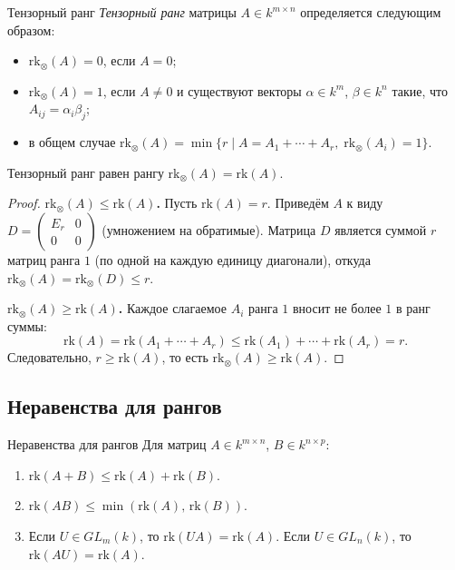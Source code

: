 \begin{Definition}{Тензорный ранг}{}
    \emph{Тензорный ранг} матрицы $A \in k^{m \times n}$ определяется следующим образом:
    \begin{itemize}
        \item $\mathrm{rk}_{\otimes}(A) = 0$, если $A = 0$;
        \item $\mathrm{rk}_{\otimes}(A) = 1$, если $A \neq 0$ и существуют векторы
              $\alpha \in k^m$, $\beta \in k^n$ такие, что $A_{ij} = \alpha_i \beta_j$;
        \item в общем случае $\mathrm{rk}_{\otimes}(A) = \min\bigl\{r \mid A = A_1 + \cdots + A_r,\;
              \mathrm{rk}_{\otimes}(A_i) = 1\bigr\}$.
    \end{itemize}
\end{Definition}
\begin{Theorem}{Тензорный ранг равен рангу}{}
    $\mathrm{rk}_{\otimes}(A) = \mathrm{rk}(A)$.
\end{Theorem}

\begin{proof}
\textbf{$\mathrm{rk}_{\otimes}(A) \leq \mathrm{rk}(A)$.} Пусть $\mathrm{rk}(A) = r$. Приведём $A$ к виду $D = \begin{pmatrix} E_r & 0 \\ 0 & 0 \end{pmatrix}$ (умножением на обратимые). Матрица $D$ является суммой $r$ матриц ранга $1$ (по одной на каждую единицу диагонали), откуда $\mathrm{rk}_{\otimes}(A) = \mathrm{rk}_{\otimes}(D) \leq r$.

\textbf{$\mathrm{rk}_{\otimes}(A) \geq \mathrm{rk}(A)$.} Каждое слагаемое $A_i$ ранга $1$ вносит не более $1$ в ранг суммы:
\[
    \mathrm{rk}(A) = \mathrm{rk}(A_1 + \cdots + A_r) \leq \mathrm{rk}(A_1) + \cdots + \mathrm{rk}(A_r) = r.
\]
Следовательно, $r \geq \mathrm{rk}(A)$, то есть $\mathrm{rk}_{\otimes}(A) \geq \mathrm{rk}(A)$.
\end{proof}

\subsection{Неравенства для рангов}

\begin{Theorem}{Неравенства для рангов}{}
    Для матриц $A \in k^{m \times n}$, $B \in k^{n \times p}$:
    \begin{enumerate}
        \item $\mathrm{rk}(A + B) \leq \mathrm{rk}(A) + \mathrm{rk}(B)$.
        \item $\mathrm{rk}(AB) \leq \min(\mathrm{rk}(A),\, \mathrm{rk}(B))$.
        \item Если $U \in GL_m(k)$, то $\mathrm{rk}(UA) = \mathrm{rk}(A)$. Если $U \in GL_n(k)$, то $\mathrm{rk}(AU) = \mathrm{rk}(A)$.
    \end{enumerate}
\end{Theorem}

